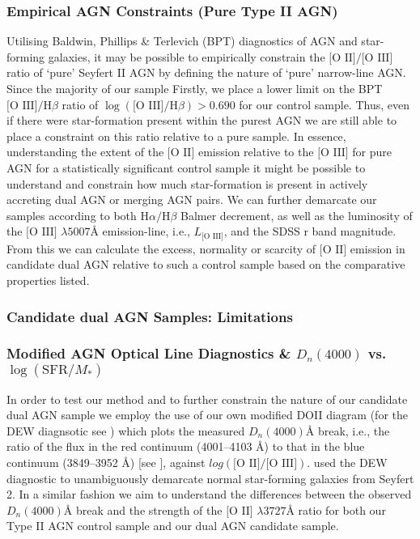 \subsubsection{Empirical AGN Constraints (Pure Type II AGN)}

Utilising Baldwin, Phillips \& Terlevich (BPT) diagnostics of AGN and star-forming galaxies, it may be possible to empirically constrain the $\text{[O II]}/\text{[O III]}$ ratio of `pure' Seyfert II AGN by defining the nature of `pure' narrow-line AGN. Since the majority of our sample Firstly, we place a lower limit on the BPT $\text{[O III]}/\text{H}\beta$ ratio of $\log(\text{[O III]}/\text{H}\beta)>{0.690}$ for our control sample. Thus, even if there were star-formation present within the purest AGN we are still able to place a constraint on this ratio relative to a pure sample. In essence, understanding the extent of the $\text{[O II]}$ emission relative to the $\text{[O III]}$ for pure AGN for a statistically significant control sample it might be possible to understand and constrain how much star-formation is present in actively accreting dual AGN or merging AGN pairs. We can further demarcate our samples according to both $\text{H}\alpha/\text{H}\beta$ Balmer decrement, as well as the luminosity of the $\text{[O III]}$ $\lambda{5007}Å$ emission-line, i.e., $L_{\text{[O III]}}$, and the SDSS r band magnitude. From this we can calculate the excess, normality or scarcity of $\text{[O II]}$ emission in candidate dual AGN relative to such a control sample based on the comparative properties listed.

\subsubsection{Candidate dual AGN Samples: Limitations}
\subsubsection{Modified AGN Optical Line Diagnostics \& $D_{n}(4000)$ vs. $\log(\text{SFR}/M_{*})$}

In order to test our method and to further constrain the nature of our candidate dual AGN sample we employ the use of our own modified DOII diagram (for the DEW diagnsotic see \cite{Stasinska_2006}) which plots the measured $D_{n}(4000)Å$ break, i.e., the ratio of the flux in the red continuum (4001--4103 Å) to that in the blue continuum (3849--3952 Å) [see \cite{Balogh_1999}], against $log(\text{[O II]}/\text{[O III]})$. \cite{Marocco_2011} used the DEW diagnostic to unambiguously demarcate normal star-forming galaxies from Seyfert 2. In a similar fashion we aim to understand the differences between the observed $D_{n}(4000)Å$ break and the strength of the $\text{[O II]}$ $\lambda{3727}Å$ ratio for both our Type II AGN control sample and our dual AGN candidate sample.
  